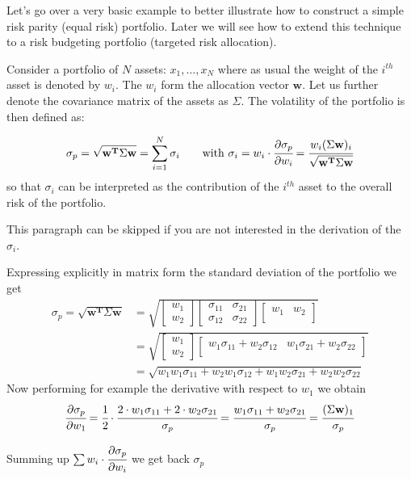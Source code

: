 Let's go over a very basic example to better illustrate how to construct
a simple risk parity (equal risk) portfolio. Later we will see how
to extend this technique to a risk budgeting portfolio (targeted risk
allocation).

Consider a portfolio of \(N\) assets: \(x_{1}, \ldots, x_N\) where as
usual the weight of the $i^{th}$ asset is denoted by \(w_{i}\). The
\(w_{i}\) form the allocation vector \(\mathbf{w}\). Let us further
denote the covariance matrix of the assets as \(\Sigma\). The volatility
of the portfolio is then defined as:

\begin{equation} \sigma_p={\sqrt {\mathbf{w^T}\Sigma \mathbf{w}}} = \sum_{i=1}^{N}\sigma _{i}\qquad\textrm{with}~\sigma _{i} = w_{i}\cdot \cfrac{\partial\sigma_p}{\partial w_{i}}={\cfrac {w_{i}(\Sigma \mathbf{w})_{i}}{\sqrt {\mathbf{w^T}\Sigma \mathbf{w}}}}\end{equation}
so that \(\sigma _{i}\) can be interpreted as the contribution of the $i^{th}$ asset to the overall risk of the portfolio.

\begin{tcolorbox}[breakable, size=fbox, boxrule=1pt, pad at break*=1mm,colback=cream, colframe=cellborder]
This paragraph can be skipped if you are not interested in the derivation of the $\sigma_i$.

Expressing explicitly in matrix form the standard deviation of the portfolio we get
\[
\begin{split}
	\sigma_p={\sqrt {\mathbf{w^T}\Sigma \mathbf{w}}} & =
	\sqrt{
		\begin{bmatrix}
			w_{1} \\
			w_{2}
		\end{bmatrix}
		\begin{bmatrix}
			\sigma_{11} & \sigma_{21} \\
			\sigma_{12} & \sigma_{22} 
		\end{bmatrix}
		\begin{bmatrix}
			w_{1} & w_{2} \\
		\end{bmatrix}
	}\\
	&=
	\sqrt{
		\begin{bmatrix}
			w_{1} \\
			w_{2}
		\end{bmatrix}
		\begin{bmatrix}
			w_{1}\sigma_{11} + w_{2}\sigma_{12} & w_{1}\sigma_{21} + w_{2}\sigma_{22} \\
		\end{bmatrix}
	} \\
	&= \sqrt{
		w_{1}w_{1}\sigma_{11} + w_{2}w_{1}\sigma_{12} + w_{1}w_{2}\sigma_{21} + w_{2}w_{2}\sigma_{22} }
\end{split}
\]
Now performing for example the derivative with respect to $w_1$ we obtain
\[\cfrac{\partial\sigma_p}{\partial w_1} = \cfrac{1}{2}\cdot\cfrac{2\cdot w_1\sigma_{11} + 2\cdot w_{2}\sigma_{21}}{\sigma_p} = \cfrac{w_1\sigma_{11} + w_{2}\sigma_{21}}{\sigma_p} = \cfrac{(\Sigma \mathbf{w})_{1}}{\sigma_p}\]

Summing up $\sum w_i\cdot\cfrac{\partial\sigma_p}{\partial w_i}$ we get back $\sigma_p$
\end{tcolorbox}

